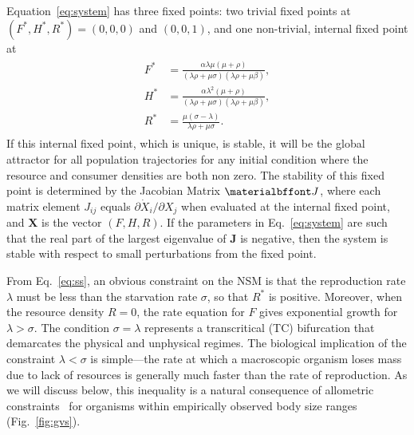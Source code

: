 \documentclass{pnastwo}
\begin{document}
\begin{article}
Equation~\eqref{eq:system} has three fixed points: two trivial fixed points
at $(F^*,H^*,R^*)=(0,0,0)$ and $(0,0,1)$, and one non-trivial, internal
fixed point at
\begin{eqnarray}
\label{eq:ss}
\begin{split}
F^* &= \frac{\alpha  \lambda  \mu  (\mu +\rho )}{(\lambda  \rho +\mu  \sigma ) (\lambda  \rho +\mu  \beta)}, \\
H^* &= \frac{\alpha  \lambda ^2 (\mu +\rho )}{(\lambda  \rho +\mu  \sigma ) (\lambda  \rho +\mu  \beta)}, \\
R^* &= \frac{\mu  (\sigma -\lambda )}{\lambda  \rho +\mu  \sigma }.
\end{split}
\end{eqnarray}
If this internal fixed point, which is unique, is stable, it will be the
global attractor for all population trajectories for any initial condition
where the resource and consumer densities are both non zero.  The stability
of this fixed point is determined by the Jacobian Matrix $\bf J$, where each
matrix element $J_{ij}$ equals $\partial{\dot X_i}/\partial{X_j}$ when
evaluated at the internal fixed point, and $\mathbf{X}$ is the vector
$(F,H,R)$.  If the parameters in Eq.~\eqref{eq:system} are such that the real
part of the largest eigenvalue of $\mathbf{J}$ is negative, then the system
is stable with respect to small perturbations from the fixed point.

From Eq.~\eqref{eq:ss}, an obvious constraint on the NSM is that the
reproduction rate $\lambda$ must be less than the starvation rate $\sigma$,
so that $R^*$ is positive.  Moreover, when the resource density $R=0$, the
rate equation for $F$ gives exponential growth for $\lambda>\sigma$.  The
condition $\sigma = \lambda$ represents a transcritical (TC) bifurcation that
demarcates the physical and unphysical regimes.  The biological implication
of the constraint $\lambda<\sigma$ is simple---the rate at which a
macroscopic organism loses mass due to lack of resources is generally much
faster than the rate of reproduction.  As we will discuss below, this
inequality is a natural consequence of allometric
constraints~\cite{Kempes:2012hy} for organisms within empirically observed
body size ranges (Fig.~\ref{fig:gvs}).


\end{article}
\end{document}
